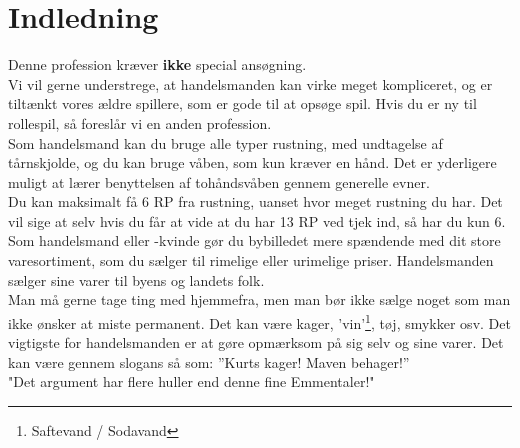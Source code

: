 \chapter{Indledning}
Denne profession kræver \textbf{ikke} special ansøgning.\\

Vi vil gerne understrege, at handelsmanden kan virke meget kompliceret, og er tiltænkt vores ældre spillere, som er gode til at opsøge spil. Hvis du er ny til rollespil, så foreslår vi en anden profession.\\

Som handelsmand kan du bruge alle typer rustning, med undtagelse af tårnskjolde, og du kan bruge våben, som kun kræver en hånd. Det er yderligere muligt at lærer benyttelsen af tohåndsvåben gennem generelle evner.\\
Du kan maksimalt få 6 RP fra rustning, uanset hvor meget rustning du har. Det vil sige at selv hvis du får at vide at du har 13 RP ved tjek ind, så har du kun 6.\\

Som handelsmand eller -kvinde gør du bybilledet mere spændende med dit store varesortiment, som du sælger til rimelige eller urimelige priser. Handelsmanden sælger sine varer til byens og landets folk.\\
Man må gerne tage ting med hjemmefra, men man bør ikke sælge noget som man ikke ønsker at miste permanent. Det kan være kager, 'vin'\footnote{Saftevand / Sodavand}, tøj, smykker osv. Det vigtigste for handelsmanden er at gøre opmærksom på sig selv og sine varer. Det kan være gennem slogans så som: ”Kurts kager! Maven behager!”\\
"Det argument har flere huller end denne fine Emmentaler!"\\